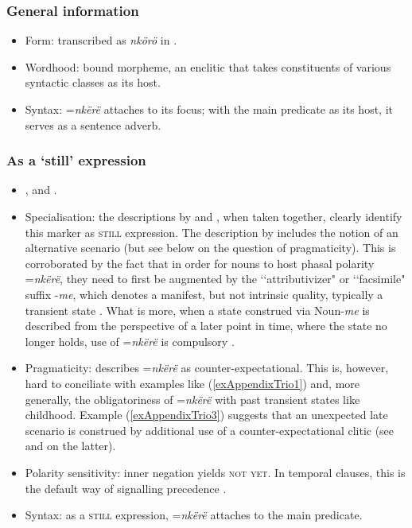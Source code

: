 \subsubsection{General information}
\begin{itemize}
	\item Form: transcribed as \textit{nkörö} in \textcite{Letschert1998}.
	\item Wordhood: bound morpheme, an enclitic that takes constituents of various syntactic classes as its host.
	\item Syntax: \mbox{=\textit{nkërë}} attaches to its focus; with the main predicate as its host, it serves as a sentence adverb.
\end{itemize}

\subsubsection{As a \lq{}still\rq{ }expression}
\begin{itemize}
	\sloppy
	\item \textcite[130, 453–454, 504]{Carlin2004}, \textcite[15]{Letschert1998} and \textcite[468–469]{Meira1999}.
	\item Specialisation: the descriptions by \textcite{Carlin2004} and \textcite{Meira1999}, when taken together, clearly identify this marker as \textsc{still} expression. The description by \textcite[453–454]{Carlin2004} includes the notion of an alternative scenario (but see below on the question of pragmaticity). This is corroborated by the fact that in order for nouns to host phasal polarity \mbox{=\textit{nkërë}}, they need to first be augmented by the \lq\lq attributivizer" \parencite{Meira1999} or \lq\lq facsimile" \parencite{Carlin2004} suffix \mbox{-\textit{me}}, which denotes a manifest, but not intrinsic quality, typically a transient state \parencite[123–124, 130]{Carlin2004}. What is more, when a state construed via \mbox{Noun-\textit{me}} is described from the perspective of a later point in time, where the state no longer holds, use of \mbox{=\textit{nkërë}} is compulsory \parencite[130]{Carlin2004}. 
	\item Pragmaticity: \textcite[450]{Carlin2004} describes \mbox{=\textit{nkërë}} as counter-expectational. This is, however, hard to conciliate with examples like (\ref{exAppendixTrio1}) and, more generally, the obligatoriness of \mbox{=\textit{nkërë}} with past transient states like childhood. Example (\ref{exAppendixTrio3}) suggests that an unexpected late scenario is construed by additional use of a counter-expectational clitic (see \cite[461–462]{Meira1999} and \cite[451–452]{Carlin2004} on the latter).
	\item Polarity sensitivity: inner negation yields \textsc{not yet}. In temporal clauses, this is the default way of signalling precedence \parencite[504]{Carlin2004}.
	\item Syntax: as a \textsc{still} expression, \mbox{=\textit{nkërë}} attaches to the main predicate.
\end{itemize}

